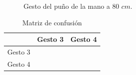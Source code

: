 \begin{figure}[h!]
\caption{Gesto del puño de la mano a $80$ $cm$.} \label{fig:G2INO80}
\end{figure}

\begin{table}[h!] 
\begin{center}
\begin{tabular}{ r || c | c |} 
 
        & Gesto 3 & Gesto 4 \\ \hline \hline  
Gesto 3 &      &      \\ \hline  
Gesto 4 &      &       \\   

\end{tabular}
\end{center} 
\caption{Matriz de confusión}
\end{table}

